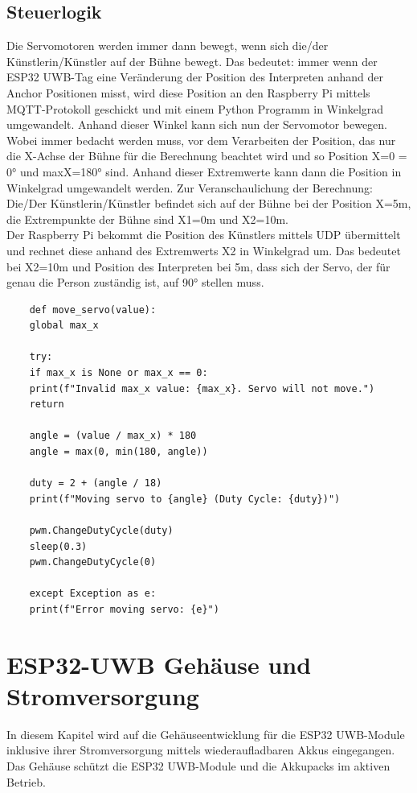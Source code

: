 \subsection{Steuerlogik} \label{Steuerlogik}
Die Servomotoren werden immer dann bewegt, wenn sich die/der Künstlerin/Künstler auf der Bühne bewegt. Das bedeutet: immer wenn der ESP32 UWB-Tag eine Veränderung der Position des Interpreten anhand der Anchor Positionen misst, wird diese Position an den Raspberry Pi mittels MQTT-Protokoll geschickt und mit einem Python Programm in Winkelgrad umgewandelt. Anhand dieser Winkel kann sich nun der Servomotor bewegen. Wobei immer bedacht werden muss, vor dem Verarbeiten der Position, das nur die X-Achse der Bühne für die Berechnung beachtet wird und so Position X=0 = 0° und maxX=180° sind. Anhand dieser Extremwerte kann dann die Position in Winkelgrad umgewandelt werden. Zur Veranschaulichung der Berechnung:\\
Die/Der Künstlerin/Künstler befindet sich auf der Bühne bei der Position X=5m, die Extrempunkte der Bühne sind X1=0m und X2=10m.\\
Der Raspberry Pi bekommt die Position des Künstlers mittels UDP übermittelt und rechnet diese anhand des Extremwerts X2 in Winkelgrad um. Das bedeutet bei X2=10m und Position des Interpreten bei 5m, dass sich der Servo, der für genau die Person zuständig ist, auf 90° stellen muss. \\


\begin{lstlisting}
	def move_servo(value):
	global max_x
	
	try:
	if max_x is None or max_x == 0:
	print(f"Invalid max_x value: {max_x}. Servo will not move.")
	return
	
	angle = (value / max_x) * 180
	angle = max(0, min(180, angle)) 
	
	duty = 2 + (angle / 18)
	print(f"Moving servo to {angle} (Duty Cycle: {duty})")
	
	pwm.ChangeDutyCycle(duty)
	sleep(0.3)
	pwm.ChangeDutyCycle(0) 
	
	except Exception as e:
	print(f"Error moving servo: {e}")
\end{lstlisting}

\newpage
\section{ESP32-UWB Gehäuse und Stromversorgung}
In diesem Kapitel wird auf die Gehäuseentwicklung für die ESP32 UWB-Module inklusive ihrer Stromversorgung mittels wiederaufladbaren Akkus eingegangen. Das Gehäuse schützt die ESP32 UWB-Module und die Akkupacks im aktiven Betrieb.

